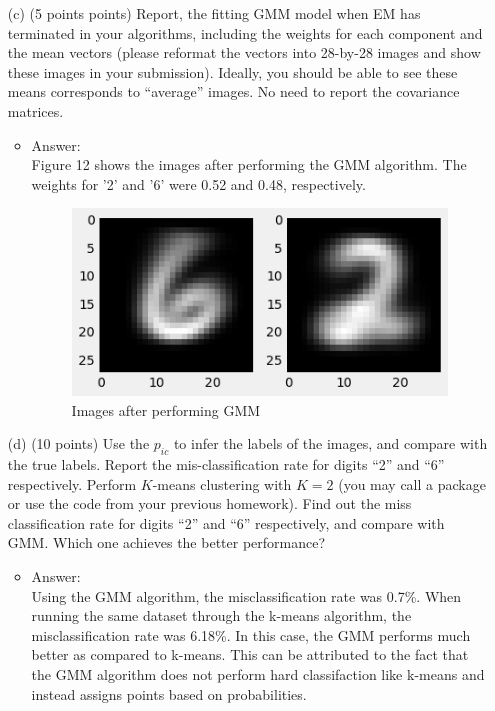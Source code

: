 \documentclass[twoside,10pt]{article}
\begin{document}
\begin{enumerate}
\begin{itemize}
\end{itemize} 
\item[(c)] (5 points points) Report, the fitting GMM model when EM has terminated in your algorithms, including the weights for each component and the mean vectors (please reformat the vectors into 28-by-28 images and show these images in your submission). Ideally, you should be able to see these means corresponds to ``average'' images.  No need to report the covariance matrices. 

\begin{itemize}
\item Answer:\\
Figure 12 shows the images after performing the GMM algorithm. The weights for '2' and '6' were 0.52 and 0.48, respectively.
\begin{figure}[h!]
\begin{center}
\includegraphics[totalheight=2in]{Images/Q3c.png}
\end{center}
\caption{Images after performing GMM}
\end{figure}
\end{itemize}

\item[(d)] (10 points) Use the $p_{ic}$ to infer the labels of the images, and compare with the true labels. Report the mis-classification rate for digits ``2'' and ``6'' respectively. Perform $K$-means clustering with $K=2$ (you may call a package or use the code from your previous homework). Find out the  miss classification rate for digits ``2'' and ``6'' respectively, and compare with GMM. Which one achieves the better performance?

\begin{itemize}
\item Answer:\\
Using the GMM algorithm, the misclassification rate was 0.7\%. When running the same dataset through the k-means algorithm, the misclassification rate was 6.18\%. In this case, the GMM performs much better as compared to k-means. This can be attributed to the fact that the GMM algorithm does not perform hard classifaction like k-means and instead assigns points based on probabilities.


\end{itemize}
\end{enumerate}
\end{document}
